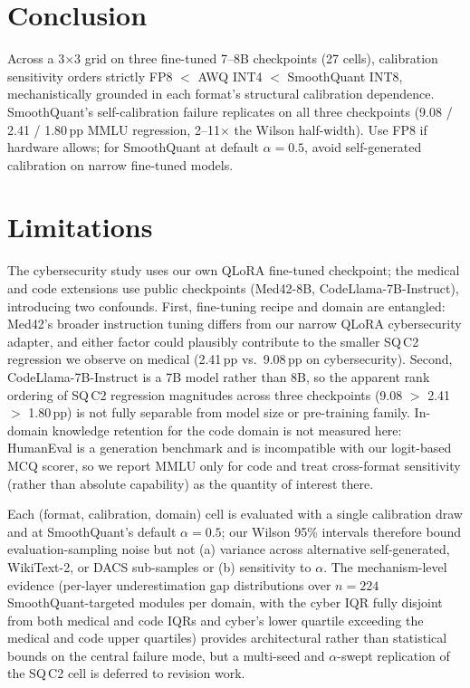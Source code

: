 \documentclass[11pt]{article}
\newcommand{\dacs}{DACS}
\begin{document}
\section{Conclusion}
\label{sec:conclusion}

Across a 3$\times$3 grid on three fine-tuned 7--8B checkpoints
(27 cells), calibration sensitivity orders strictly FP8 $<$ AWQ
INT4 $<$ SmoothQuant INT8, mechanistically grounded in each format's
structural calibration dependence.  SmoothQuant's self-calibration
failure replicates on all three checkpoints (9.08 / 2.41 / 1.80\,pp
MMLU regression, 2--11$\times$ the Wilson half-width).  Use FP8 if
hardware allows; for SmoothQuant at default $\alpha\!=\!0.5$, avoid
self-generated calibration on narrow fine-tuned models.

\section*{Limitations}

The cybersecurity study uses our own QLoRA fine-tuned checkpoint; the
medical and code extensions use public checkpoints (Med42-8B,
CodeLlama-7B-Instruct), introducing two confounds.  First, fine-tuning
recipe and domain are entangled: Med42's broader instruction tuning
differs from our narrow QLoRA cybersecurity adapter, and either
factor could plausibly contribute to the smaller SQ\,C2 regression we
observe on medical (2.41\,pp vs.\ 9.08\,pp on cybersecurity).  Second,
CodeLlama-7B-Instruct is a 7B model rather than 8B, so the apparent
rank ordering of SQ\,C2 regression magnitudes across three
checkpoints (9.08 $>$ 2.41 $>$ 1.80\,pp) is not fully separable from
model size or pre-training family.  In-domain knowledge retention for
the code domain is not measured here: HumanEval is a generation
benchmark and is incompatible with our logit-based MCQ scorer, so we
report MMLU only for code and treat cross-format sensitivity (rather
than absolute capability) as the quantity of interest there.

\begin{sloppypar}
Each (format, calibration, domain) cell is evaluated with a single
calibration draw and at SmoothQuant's default
$\alpha\!=\!0.5$; our Wilson 95\% intervals therefore bound
evaluation-sampling noise but not (a) variance across alternative
self-generated, WikiText-2, or \dacs{} sub-samples or (b) sensitivity
to $\alpha$.  The mechanism-level evidence (per-layer
underestimation gap distributions over $n=224$ SmoothQuant-targeted
modules per domain, with the cyber IQR fully disjoint from both
medical and code IQRs and cyber's lower quartile exceeding the
medical and code upper quartiles) provides architectural rather than
statistical bounds on the central failure mode, but a multi-seed and $\alpha$-swept replication
of the SQ\,C2 cell is deferred to revision work.
\end{sloppypar}
\end{document}
